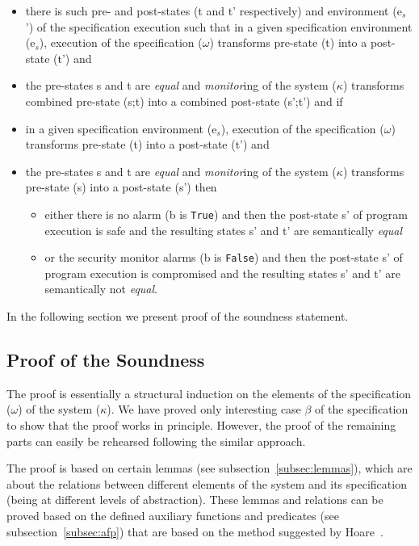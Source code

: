 \documentclass[conference]{IEEEtran}
\begin{document}
\begin{itemize}
\item there is such pre- and post-states (t and t' respectively) and environment (e$_s$') of the specification execution such that in a given specification environment (e$_s$), execution of the specification ($\omega$) transforms pre-state (t) into a post-state (t') and
\item the pre-states s and t are \emph{equal} and \emph{monitor}ing of the system ($\kappa$) transforms combined pre-state (s;t) into a combined post-state (s';t') and if
\item in a given specification environment (e$_s$), execution of the specification ($\omega$) transforms pre-state (t) into a post-state (t') and
\item the pre-states s and t are \emph{equal} and \emph{monitor}ing of the system ($\kappa$) transforms pre-state (s) into a post-state (s') then
\begin{itemize}
\item either there is no alarm (b is \texttt{True}) and then the post-state s' of program execution is safe and the resulting states s' and t' are semantically \emph{equal}
\item or the security monitor alarms (b is \texttt{False}) and then the post-state s' of program execution is compromised and the resulting states s' and t' are semantically not \emph{equal}.
\end{itemize}
\end{itemize}

In the following section we present proof of the soundness statement.
\subsection{Proof of the Soundness}
The proof is essentially a structural induction on the elements of the specification ($\omega$) of the system ($\kappa$). We have proved only interesting case $\beta$ of the specification to show that the proof works in principle. However, the proof of the remaining parts can easily be rehearsed following the similar approach. 

The proof is based on certain lemmas (see subsection~\ref{subsec:lemmas}), which are about the relations between different elements of the system and its specification (being at different levels of abstraction). These lemmas and relations can be proved based on the defined auxiliary functions and predicates (see subsection~\ref{subsec:afp}) that are based on the method suggested by Hoare~\cite{Hoare72}. 
\end{document}
